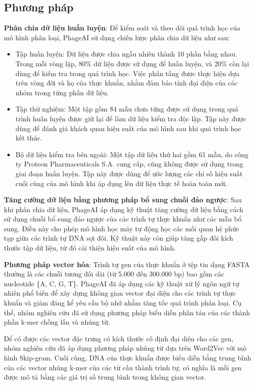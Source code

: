 \subsection{Phương pháp}
\textbf{Phân chia dữ liệu huấn luyện}: Để kiểm soát và theo dõi quá trình học của mô hình phân loại, PhageAI sử dụng chiến lược phân chia dữ liệu như sau:
\begin{itemize}
    \item Tập huấn luyện: Dữ liệu được chia ngẫu nhiên thành 10 phần bằng nhau. Trong mỗi vòng lặp, 80\% dữ liệu được sử dụng để huấn luyện, và 20\% còn lại dùng để kiểm tra trong quá trình học. Việc phân tầng được thực hiện dựa trên vòng đời và họ của thực khuẩn, nhằm đảm bảo tính đại diện của các nhóm trong từng phần dữ liệu.
    
    \item Tập thử nghiệm: Một tập gồm 84 mẫu chưa từng được sử dụng trong quá trình huấn luyện được giữ lại để làm dữ liệu kiểm tra độc lập. Tập này được dùng để đánh giá khách quan hiệu suất của mô hình sau khi quá trình học kết thúc.
    
    \item Bộ dữ liệu kiểm tra bên ngoài: Một tập dữ liệu thứ hai gồm 61 mẫu, do công ty Proteon Pharmaceuticals S.A. cung cấp, cũng không được sử dụng trong giai đoạn huấn luyện. Tập này được dùng để ước lượng các chỉ số hiệu suất cuối cùng của mô hình khi áp dụng lên dữ liệu thực tế hoàn toàn mới.
\end{itemize}

\textbf{Tăng cường dữ liệu bằng phương pháp bổ sung chuỗi đảo ngược}: Sau khi phân chia dữ liệu, PhageAI áp dụng kỹ thuật tăng cường dữ liệu bằng cách sử dụng chuỗi bổ sung đảo ngược của các trình tự thực khuẩn như các mẫu bổ sung. Điều này cho phép mô hình học máy tự động học các mối quan hệ phức tạp giữa các trình tự DNA sợi đôi. Kỹ thuật này còn giúp tăng gấp đôi kích thước tập dữ liệu, từ đó cải thiện hiệu suất của mô hình.

\textbf{Phương pháp vector hóa}: Trình tự gen của thực khuẩn ở tệp tin dạng FASTA thường là các chuỗi tương đối dài (từ 5.000 đến 300.000 bp) bao gồm các nucleotide \{A, C, G, T\}. PhageAI đã áp dụng các kỹ thuật xử lý ngôn ngữ tự nhiên phổ biến để xây dựng không gian vector đại diện cho các trình tự thực khuẩn và giảm đáng kể yêu cầu bộ nhớ nhằm tăng tốc quá trình phân loại. Cụ thể, nhóm nghiên cứu đã sử dụng phương pháp biểu diễn phân tán của các thành phần k-mer chồng lấn và nhúng từ.

Để có được các vector đặc trưng có kích thước cố định đại diện cho các gen, nhóm nghiên cứu đã áp dụng phương pháp nhúng từ dựa trên Word2Vec với mô hình Skip-gram. Cuối cùng, DNA của thực khuẩn được biểu diễn bằng trung bình của các vector nhúng k-mer của các từ cấu thành trình tự, có nghĩa là mỗi gen được mô tả bằng các giá trị số trung bình trong không gian vector.

